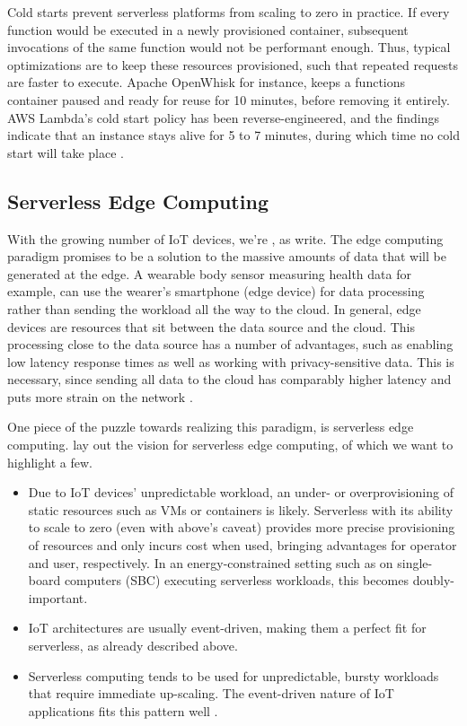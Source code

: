 Cold starts prevent serverless platforms from scaling to zero in practice. If every function would be executed in a newly provisioned container, subsequent invocations of the same function would not be performant enough. Thus, typical optimizations are to keep these resources provisioned, such that repeated requests are faster to execute. Apache OpenWhisk for instance, keeps a functions container paused and ready for reuse for 10 minutes, before removing it entirely. AWS Lambda's cold start policy has been reverse-engineered, and the findings indicate that an instance stays alive for 5 to 7 minutes, during which time no cold start will take place \cite{ShilCold2021}.

\subsection{Serverless Edge Computing}

With the growing number of IoT devices, we're , as \citeauthor{Shi2016} write. The edge computing paradigm promises to be a solution to the massive amounts of data that will be generated at the edge. A wearable body sensor measuring health data for example, can use the wearer's smartphone (edge device) for data processing rather than sending the workload all the way to the cloud. In general, edge devices are resources that sit between the data source and the cloud. This processing close to the data source has a number of advantages, such as enabling low latency response times as well as working with privacy-sensitive data. This is necessary, since sending all data to the cloud has comparably higher latency and puts more strain on the network \cite{Shi2016}.

One piece of the puzzle towards realizing this paradigm, is serverless edge computing. \citeauthor{Aslanpour2021} lay out the vision for serverless edge computing, of which we want to highlight a few.

\begin{itemize}
    \item Due to IoT devices' unpredictable workload, an under- or overprovisioning of static resources such as VMs or containers is likely. Serverless with its ability to scale to zero (even with above's caveat) provides more precise provisioning of resources and only incurs cost when used, bringing advantages for operator and user, respectively. In an energy-constrained setting such as on single-board computers (SBC) executing serverless workloads, this becomes doubly-important.
    \item IoT architectures are usually event-driven, making them a perfect fit for serverless, as already described above.
    \item Serverless computing tends to be used for unpredictable, bursty workloads that require immediate up-scaling. The event-driven nature of IoT applications fits this pattern well \cite{Aslanpour2021}.
\end{itemize}


